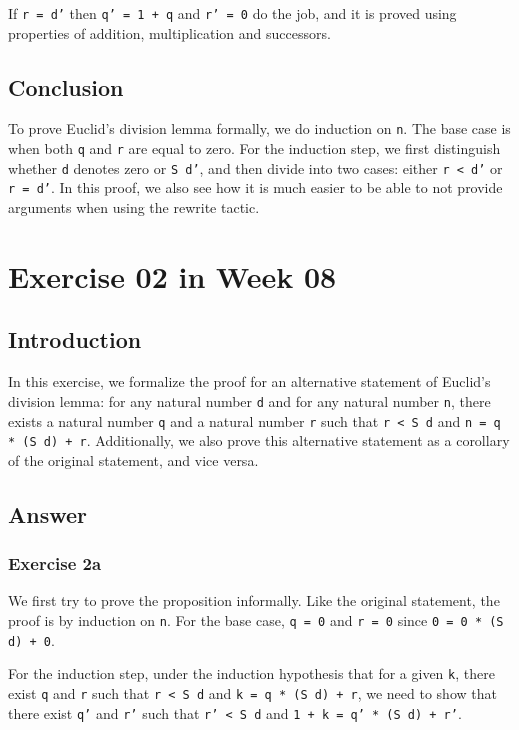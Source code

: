 \documentclass{article}
\begin{document}
If \texttt{r = d'} then \texttt{q' = 1 + q} and \texttt{r' = 0} do the job, and it is proved using properties of addition, multiplication and successors.

\subsection{Conclusion}
To prove Euclid's division lemma formally, we do induction on \texttt{n}. The base case is when both \texttt{q} and \texttt{r} are equal to zero. For the induction step, we first distinguish whether \texttt{d} denotes zero or \texttt{S d'}, and then divide into two cases: either \texttt{r < d'} or \texttt{r = d'}. In this proof, we also see how it is much easier to be able to not provide arguments when using the rewrite tactic.

\newpage

\section{Exercise 02 in Week 08}

\subsection{Introduction}
In this exercise, we formalize the proof for an alternative statement of Euclid’s division lemma: for any natural number \texttt{d} and for any natural number \texttt{n}, there exists a natural number \texttt{q} and a natural number \texttt{r} such that \texttt{r < S d} and \texttt{n = q * (S d) + r}. Additionally, we also prove this alternative statement as a corollary of the original statement, and vice versa.

\subsection{Answer}
\subsubsection{Exercise 2a}
We first try to prove the proposition informally. Like the original statement, the proof is by induction on \texttt{n}. 
For the base case, \texttt{q = 0} and \texttt{r = 0} since \texttt{0 = 0 * (S d) + 0}. 

For the induction step, under the induction hypothesis that for a given \texttt{k}, there exist \texttt{q} and \texttt{r} such that \texttt{r < S d} and \texttt{k = q * (S d) + r}, we need to show that there exist \texttt{q'} and \texttt{r'} such that \texttt{r' < S d} and \texttt{1 + k = q' * (S d) + r'}.
\end{document}
